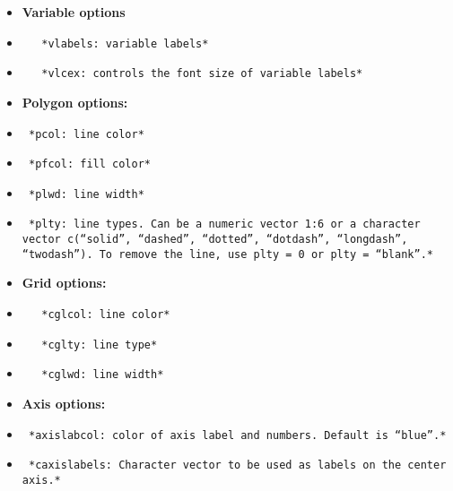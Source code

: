\documentclass[
]{article}
\begin{document}
\begin{itemize}
\item
  \textbf{Variable options}
\item
\begin{verbatim}
   *vlabels: variable labels*
\end{verbatim}
\item
\begin{verbatim}
   *vlcex: controls the font size of variable labels*
\end{verbatim}
\item
  \textbf{Polygon options:}
\item
\begin{verbatim}
 *pcol: line color*
\end{verbatim}
\item
\begin{verbatim}
 *pfcol: fill color*
\end{verbatim}
\item
\begin{verbatim}
 *plwd: line width*
\end{verbatim}
\item
\begin{verbatim}
 *plty: line types. Can be a numeric vector 1:6 or a character vector c(“solid”, “dashed”, “dotted”, “dotdash”, “longdash”, “twodash”). To remove the line, use plty = 0 or plty = “blank”.*
\end{verbatim}
\item
  \textbf{Grid options:}
\item
\begin{verbatim}
   *cglcol: line color*
\end{verbatim}
\item
\begin{verbatim}
   *cglty: line type*
\end{verbatim}
\item
\begin{verbatim}
   *cglwd: line width*
\end{verbatim}
\item
  \textbf{Axis options:}
\item
\begin{verbatim}
 *axislabcol: color of axis label and numbers. Default is “blue”.*
\end{verbatim}
\item
\begin{verbatim}
 *caxislabels: Character vector to be used as labels on the center axis.*
\end{verbatim}
\end{itemize}
\end{document}
